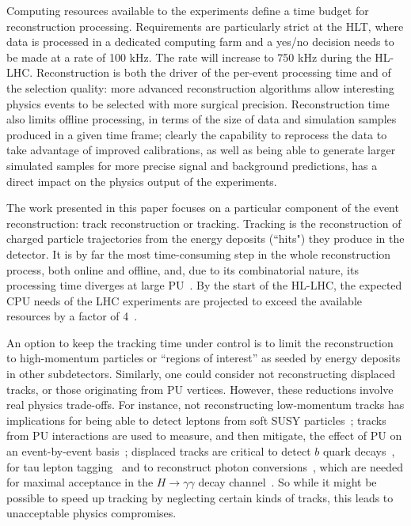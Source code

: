 \documentclass[a4paper,11pt]{article}
\begin{document}
Computing resources available to the experiments define a time budget for reconstruction processing. Requirements are particularly strict at the HLT, where data is processed in a dedicated computing farm and a yes/no decision needs to be made at a rate of 100 kHz. The rate will increase to 750 kHz during the HL-LHC. Reconstruction is both the driver of the per-event processing time and of the selection quality: more advanced reconstruction algorithms allow interesting physics events to be selected with more surgical precision. Reconstruction time also limits offline processing, in terms of the size of data and simulation samples produced in a given time frame; 
clearly the capability to reprocess the data to take advantage of improved calibrations, as well as being able to generate larger simulated samples for more precise signal and background predictions, has a direct impact on the physics output of the experiments. 

The work presented in this paper focuses on a particular component of the event reconstruction: track reconstruction or tracking. Tracking is the reconstruction of charged particle trajectories from the energy deposits (``hits") they produce in the detector. It is by far the most time-consuming step in the whole reconstruction process, both online and offline, and, due to its combinatorial nature, its processing time diverges at large PU~\cite{Cerati:2015vna}. By the start of the HL-LHC, the expected CPU needs of the LHC experiments are projected to exceed the available resources by a factor of 4~\cite{IRISHEP}. 


An option to keep the tracking time under control is to limit the reconstruction to high-momentum particles or ``regions of interest'' as seeded by energy deposits in other subdetectors. Similarly, one could consider not reconstructing displaced tracks, or those originating from PU vertices. However, these reductions involve real physics trade-offs.  For instance, not reconstructing low-momentum tracks has implications for being able to detect leptons from soft SUSY particles~\cite{Khachatryan:2015pot}; tracks from PU interactions are used to measure, and then mitigate, the effect of PU on an event-by-event basis~\cite{Bertolini:2014bba}; displaced tracks are critical to detect $b$ quark decays~\cite{Sirunyan:2017ezt}, for tau lepton tagging~\cite{Sirunyan:2018pgf} and to reconstruct photon conversions~\cite{Khachatryan:2010pw}, which are needed for maximal acceptance in the $H\to\gamma\gamma$ decay channel~\cite{Khachatryan:2014ira}. So while it might be possible to speed up tracking by neglecting certain kinds of tracks, this leads to unacceptable physics compromises. 
\end{document}

